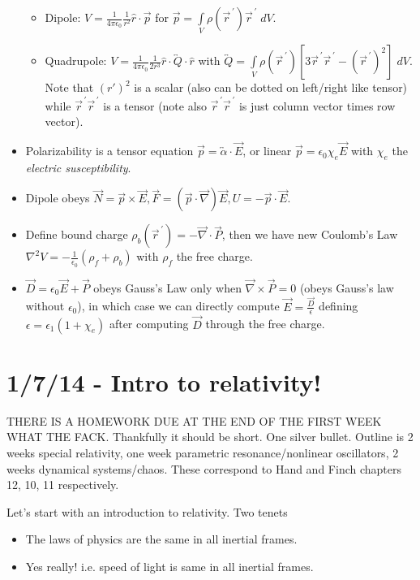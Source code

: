 \documentclass[10pt]{report}
\newcommand{\tensor}[1]{\overleftrightarrow{#1}}
\newcommand{\pvec}[1]{\vec{#1}^{\,\prime}}
\begin{document}
\begin{itemize}
\begin{itemize}
            \item Dipole: $V = \frac{1}{4\pi\epsilon_0}\frac{1}{r^2}\hat{r}\cdot \vec{p}$ for $\vec{p} = \displaystyle\int\limits_{V}^{}\rho(\pvec{r})\pvec{r}\;dV$.
            \item Quadrupole: $V = \frac{1}{4\pi\epsilon_0}\frac{1}{2r^3} \hat{r}\cdot \tensor{Q} \cdot \hat{r}$ with $\tensor{Q} = \displaystyle\int\limits_{V}^{}\rho(\pvec{r})\left[ 3\pvec{r}\pvec{r} - \left( \pvec{r} \right)^2 \right]\;dV$. Note that $(r')^2$ is a scalar (also can be dotted on left/right like tensor) while $\pvec{r}\pvec{r}$ is a tensor (note also $\pvec{r}\pvec{r}$ is just column vector times row vector).
        \end{itemize}
    \item Polarizability is a tensor equation $\vec{p} = \tensor{\alpha}\cdot \vec{E}$, or linear $\vec{p} = \epsilon_0 \chi_e \vec{E}$ with $\chi_e$ the \emph{electric susceptibility}.
    \item Dipole obeys $\vec{N} = \vec{p}\times\vec{E}, \vec{F} = \left( \vec{p}\cdot \vec{\nabla } \right)\vec{E}, U = -\vec{p}\cdot \vec{E}$.
    \item Define bound charge $\rho_b(\pvec{r}) = -\vec{\nabla}\cdot\vec{P}$, then we have new Coulomb's Law $\nabla^2 V = -\frac{1}{\epsilon_0}\left( \rho_f + \rho_b \right)$ with $\rho_f$ the free charge.
    \item $\vec{D} = \epsilon_0 \vec{E} + \vec{P}$ obeys Gauss's Law only when $\vec{\nabla }\times\vec{P} = 0$ (obeys Gauss's law without $\epsilon_0$), in which case we can directly compute $\vec{E} = \frac{\vec{D}}{\epsilon}$ defining $\epsilon = \epsilon_1(1 + \chi_e)$ after computing $\vec{D}$ through the free charge.
\end{itemize}

\chapter{1/7/14 - Intro to relativity!}

THERE IS A HOMEWORK DUE AT THE END OF THE FIRST WEEK WHAT THE FACK. Thankfully it should be short. One silver bullet. Outline is 2 weeks special relativity, one week parametric resonance/nonlinear oscillators, 2 weeks dynamical systems/chaos. These correspond to Hand and Finch chapters 12, 10, 11 respectively. 

Let's start with an introduction to relativity. Two tenets
\begin{itemize}
    \item The laws of physics are the same in all inertial frames.
    \item Yes really! i.e. speed of light is same in all inertial frames.
\end{itemize}
\end{document}
